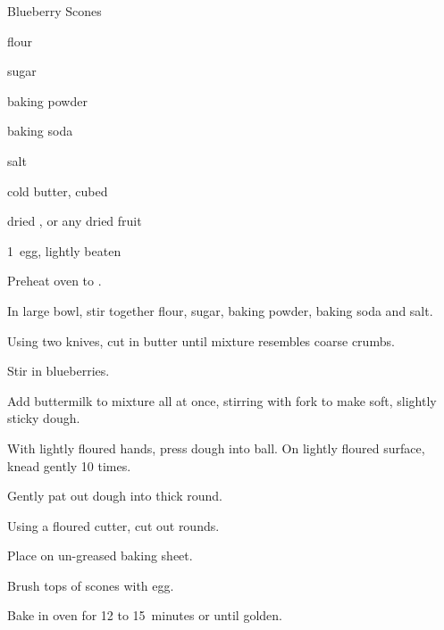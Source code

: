 \begin{recipe}{Blueberry Scones}{}{}

\begin{ingredients}
\item \C{2\quarter} flour
\item {} sugar
\item \tp{2\half} baking powder
\item \tp{\half} baking soda
\item \tp{\half} salt
\item \C{\half} cold butter, cubed
\item \C{\half} dried ,  or any dried fruit
\item {} 
\item 1~egg, lightly beaten
\end{ingredients}

\begin{directions}
\item Preheat oven to .
\item In large bowl, stir together flour, sugar, baking powder, baking soda and salt.
\item Using two knives, cut in butter until mixture resembles coarse crumbs.
\item Stir in blueberries.
\item Add buttermilk to mixture all at once, stirring with fork to make soft, slightly sticky dough.
\item With lightly floured hands, press dough into ball. On lightly floured surface, knead gently 10 times.
\item Gently pat out dough into  thick round.
\item Using a  floured cutter, cut out rounds.
\item Place on un-greased baking sheet.
\item Brush tops of scones with egg.
\item Bake in oven for 12 to 15~minutes or until golden.
\end{directions}

\end{recipe}
